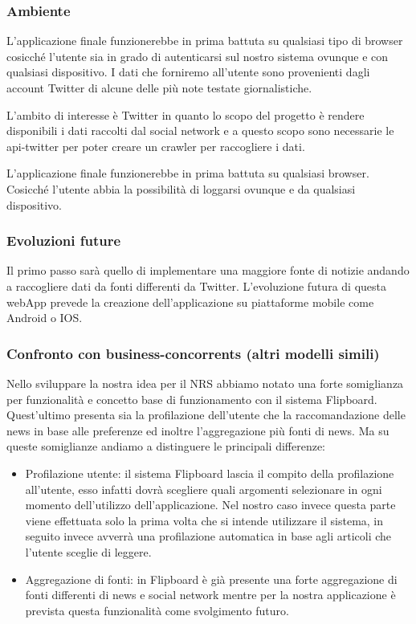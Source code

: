 \documentclass[12pt]{article}
\begin{document}
\subsubsection{Ambiente}

L’applicazione finale funzionerebbe in prima battuta su qualsiasi tipo di browser cosicché l’utente sia in grado di autenticarsi sul nostro sistema ovunque e con qualsiasi dispositivo. I dati che forniremo all’utente sono provenienti dagli account Twitter di alcune delle più note testate giornalistiche.

L’ambito di interesse è Twitter in quanto lo scopo del progetto è rendere disponibili i dati raccolti dal social network e a questo scopo sono necessarie le api-twitter per poter creare un crawler per raccogliere i dati.

L’applicazione finale funzionerebbe in prima battuta su qualsiasi browser. Cosicché l’utente abbia la possibilità di loggarsi ovunque e da qualsiasi dispositivo.

\subsubsection{Evoluzioni future}

Il primo passo sarà quello di implementare una maggiore fonte di notizie andando a raccogliere dati da fonti differenti da Twitter. L’evoluzione futura di questa webApp prevede la creazione dell’applicazione su piattaforme mobile come Android o IOS.


\subsubsection{Confronto con business-concorrents (altri modelli simili)}

Nello sviluppare la nostra idea per il NRS abbiamo notato una forte somiglianza per funzionalità e concetto base di funzionamento con il sistema Flipboard. Quest’ultimo presenta sia la profilazione dell’utente che la raccomandazione delle news in base alle preferenze ed inoltre l’aggregazione più fonti di news. Ma su queste somiglianze andiamo a distinguere le principali differenze:

\begin{itemize}
\item Profilazione utente: il sistema Flipboard lascia il compito della profilazione all’utente, esso infatti dovrà scegliere quali argomenti selezionare in ogni momento dell’utilizzo dell’applicazione. Nel nostro caso invece questa parte viene effettuata solo la prima volta che si intende utilizzare il sistema, in seguito invece avverrà una profilazione automatica in base agli articoli che l’utente sceglie di leggere.
\item Aggregazione di fonti: in Flipboard è già presente una forte aggregazione di fonti differenti di news e social network mentre per la nostra applicazione è prevista questa funzionalità come svolgimento futuro.
\end{itemize}
\end{document}
